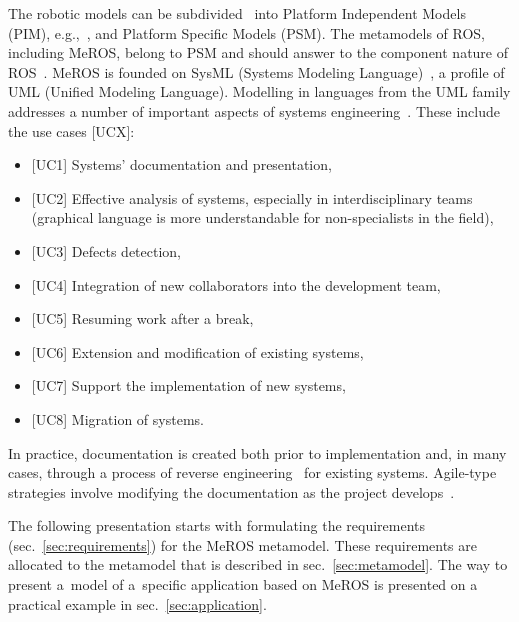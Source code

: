 The robotic models can be subdivided~\cite{de2021survey} into Platform Independent Models (PIM), e.g.,~\cite{zielinski2017variable,zielinski2010motion,tasker2020,earl2020}, and Platform Specific Models (PSM). The metamodels of ROS, including MeROS, belong to PSM and should answer to the component nature of ROS~\cite{Figat:2022:RAS,wenger2016model}.
MeROS is founded on SysML (Systems Modeling Language)~\cite{omg-sysml16,Friedenthal:2015}, a profile of UML (Unified Modeling Language). Modelling in languages from the UML family addresses a number of important aspects of systems engineering~\cite{chaudron2012effective}. These include the use cases [UCX]:
\begin{itemize}
    \item $[$UC1] Systems' documentation and presentation,
    \item $[$UC2] Effective analysis of systems, especially in interdisciplinary teams (graphical language is more understandable for non-specialists in the field),
    \item $[$UC3] Defects detection,
    \item $[$UC4] Integration of new collaborators into the development team,
    \item $[$UC5] Resuming work after a break,
    \item $[$UC6] Extension and modification of existing systems,
    \item $[$UC7] Support the implementation of new systems,
    \item $[$UC8] Migration of systems.
\end{itemize}

In practice, documentation is created both prior to implementation and, in many cases, through a process of reverse engineering~\cite{canfora2007new} for existing systems. Agile-type strategies involve modifying the documentation as the project develops~\cite{habib2021systematic}.

The following presentation starts with formulating the requirements (sec.~\ref{sec:requirements}) for the MeROS metamodel. These requirements are allocated to the metamodel that is described in sec.~\ref{sec:metamodel}. The way to present a~model of a~specific application based on MeROS is presented on a practical example in sec.~\ref{sec:application}.
